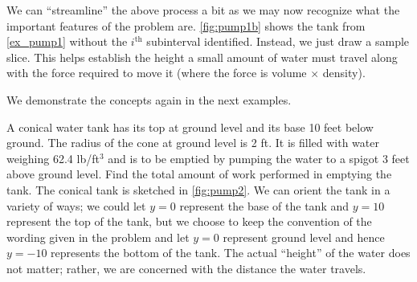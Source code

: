 We can ``streamline'' the above process a bit as we may now recognize what the important features of the problem are. \autoref{fig:pump1b} shows the tank from \autoref{ex_pump1} without the $i^{\text{th}}$ subinterval identified. Instead, we just draw a sample slice. This helps establish the height a small amount of water must travel along with the force required to move it (where the force is volume $\times$ density).

We demonstrate the concepts again in the next examples.

\begin{example}\label{ex_pump2}%
A conical water tank has its top at ground level and its base 10 feet below ground. The radius of the cone at ground level is 2 ft. It is filled with water weighing 62.4 lb/ft$^3$ and is to be emptied by pumping the water to a spigot 3 feet above ground level. Find the total amount of work performed in emptying the tank.
\solution
The conical tank is sketched in \autoref{fig:pump2}. We can orient the tank in a variety of ways; we could let $y=0$ represent the base of the tank and $y=10$ represent the top of the tank, but we choose to keep the convention of the wording given in the problem and let $y=0$ represent ground level and hence $y=-10$ represents the bottom of the tank. The actual ``height'' of the water does not matter; rather, we are concerned with the distance the water travels. 



\end{example}
